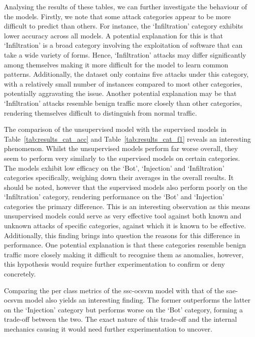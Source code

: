 Analysing the results of these tables, we can further investigate the behaviour
of the models. Firstly, we note that some attack categories appear to be more
difficult to predict than others. For instance, the `Infiltration' category
exhibits lower accuracy across all models. A potential explanation for this is
that `Infiltration' is a broad category involving the exploitation of software
that can take a wide variety of forms. Hence, `Infiltration' attacks may differ
significantly among themselves making it more difficult for the model to
learn common patterns. Additionally, the dataset only contains five attacks
under this category, with a relatively small number of instances compared to
most other categories, potentially aggravating the issue. Another potential
explanation may be that `Infiltration' attacks resemble benign traffic more
closely than other categories, rendering themselves difficult to distinguish
from normal traffic.

The comparison of the unsupervised model with the supervised models in
Table~\ref{tab:results_cat_acc} and Table~\ref{tab:results_cat_f1} reveals an
interesting phenomenon. Whilst the unsupervised models perform far worse
overall, they seem to perform very similarly to the supervised models on
certain categories. The models exhibit low efficacy on the `Bot', `Injection'
and `Infiltration' categories specifically, weighing down their averages in the
overall results. It should be noted, however that the supervised models also
perform poorly on the `Infiltration' category, rendering performance on the
`Bot' and `Injection' categories the primary difference. This is an interesting
observation as this means unsupervised models could serve as very effective
tool against both known and unknown attacks of specific categories, against
which it is known to be effective. Additionally, this finding brings into
question the reasons for this difference in performance. One potential
explanation is that these categories resemble benign traffic more closely
making it difficult to recognise them as anomalies, however, this hypothesis
would require further experimentation to confirm or deny concretely.

Comparing the per class metrics of the \gls{ssc}-\gls{ocsvm} model with that of
the \gls{sae}-\gls{ocsvm} model also yields an interesting finding. The former
outperforms the latter on the `Injection' category but performs worse on the
`Bot' category, forming a trade-off between the two. The exact nature of this
trade-off and the internal mechanics causing it would need further
experimentation to uncover.

